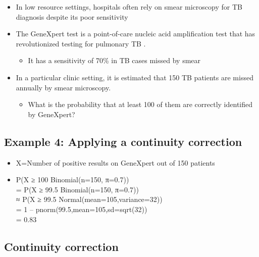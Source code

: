 \documentclass[
]{book}
\providecommand{\tightlist}{%
  \setlength{\itemsep}{0pt}\setlength{\parskip}{0pt}}
\begin{document}
\begin{itemize}
\tightlist
\item
  In low resource settings, hospitals often rely on smear microscopy for TB diagnosis despite its poor sensitivity
\item
  The GeneXpert test is a point-of-care nucleic acid amplification test that has revolutionized testing for pulmonary TB .

  \begin{itemize}
  \tightlist
  \item
    It has a sensitivity of 70\% in TB cases missed by smear
  \end{itemize}
\item
  In a particular clinic setting, it is estimated that 150 TB patients are missed annually by smear microscopy.

  \begin{itemize}
  \tightlist
  \item
    What is the probability that at least 100 of them are correctly identified by GeneXpert?
  \end{itemize}
\end{itemize}

\hypertarget{example-4-applying-a-continuity-correction}{%
\subsection{Example 4: Applying a continuity correction}\label{example-4-applying-a-continuity-correction}}

\begin{itemize}
\tightlist
\item
  X=Number of positive results on GeneXpert out of 150 patients
\item
  P(X ≥ 100 \textbar{} Binomial(n=150, π=0.7))\\
  = P(X ≥ 99.5 \textbar Binomial(n=150, π=0.7))\\
  ≈ P(X ≥ 99.5 \textbar Normal(mean=105,variance=32))\\
  = 1 -- pnorm(99.5,mean=105,sd=sqrt(32))\\
  = 0.83
\end{itemize}

\hypertarget{continuity-correction}{%
\subsection{Continuity correction}\label{continuity-correction}}
\end{document}
